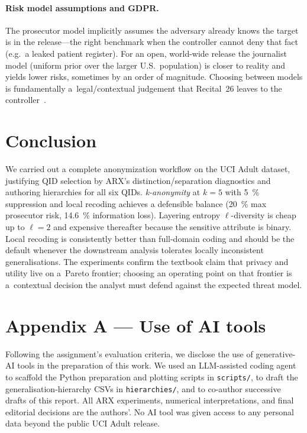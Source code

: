 \documentclass[a4paper,10pt]{article}
\begin{document}
\paragraph{Risk model assumptions and GDPR.}
The prosecutor model implicitly assumes the adversary already knows
the target is in the release---the right benchmark when the
controller cannot deny that fact (e.g.\ a leaked patient register).
For an open, world-wide release the journalist model (uniform prior
over the larger U.S.\ population) is closer to reality and yields
lower risks, sometimes by an order of magnitude. Choosing between
models is fundamentally a~legal/contextual judgement that
Recital~26 leaves to the controller~\cite{gdpr2016}.

\section{Conclusion}
\label{sec:concl}

We carried out a complete anonymization workflow on the UCI Adult
dataset, justifying QID selection by ARX's distinction/separation
diagnostics and authoring hierarchies for all six QIDs.
\emph{k-anonymity} at $k{=}5$ with \SI{5}{\percent} suppression and
local recoding achieves a defensible balance
(\SI{20}{\percent} max prosecutor risk, \SI{14.6}{\percent}
information loss). Layering entropy $\ell$-diversity is cheap up to
$\ell{=}2$ and expensive thereafter because the sensitive attribute is
binary. Local recoding is consistently better than full-domain
coding and should be the default whenever the downstream
analysis tolerates locally inconsistent generalisations. The
experiments confirm the textbook claim that privacy and utility live
on a~Pareto frontier; choosing an operating point on that frontier is
a~contextual decision the analyst must defend against the
expected threat model.




\appendix
\section*{Appendix A --- Use of AI tools}\small
Following the assignment's evaluation criteria, we disclose the use of
generative-AI tools in the preparation of this work. We used an
LLM-assisted coding agent to scaffold the Python preparation and
plotting scripts in \texttt{scripts/}, to draft the
generalisation-hierarchy CSVs in \texttt{hierarchies/}, and to
co-author successive drafts of this report. All ARX experiments,
numerical interpretations, and final editorial decisions are the
authors'. No AI tool was given access to any personal data beyond the
public UCI Adult release.
\end{document}
